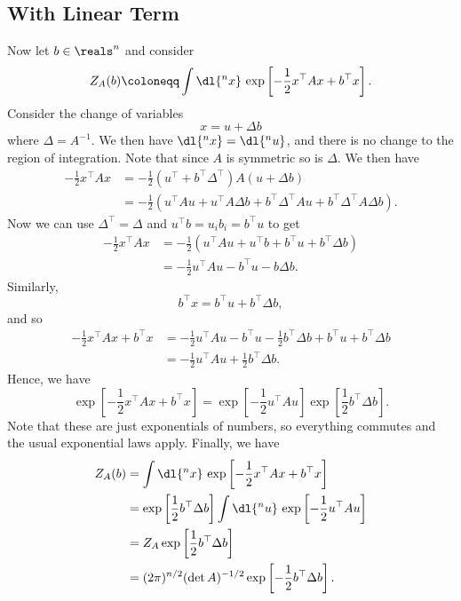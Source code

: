 \documentclass[fleqn]{NotesClass}
\newcommand{\trans}{{\top}}
\begin{document}
    \subsection{With Linear Term}
    Now let \(b \in \reals^n\) and consider
    \begin{equation}
        Z_A(b) \coloneqq \int \dl{^nx} \, \exp\left[ -\frac{1}{2} x^\trans Ax + b^\trans x \right].
    \end{equation}
    Consider the change of variables
    \begin{equation}
        x = u + \Delta b
    \end{equation}
    where \(\Delta = A^{-1}\).
    We then have \(\dl{^nx} = \dl{^nu}\), and there is no change to the region of integration.
    Note that since \(A\) is symmetric so is \(\Delta\).
    We then have
    \begin{align}
        -\frac{1}{2}x^\trans A x &= -\frac{1}{2}(u^\trans + b^\trans \Delta^\trans) A (u + \Delta b)\\
        &= -\frac{1}{2}(u^\trans A u + u^\trans A\Delta b + b^\trans \Delta^\trans A u + b^\trans \Delta^\trans A \Delta b).
    \end{align}
    Now we can use \(\Delta^\trans = \Delta\) and \(u^\trans b = u_ib_i = b^\trans u\) to get
    \begin{align}
        -\frac{1}{2} x^\trans A x &= -\frac{1}{2}(u^\trans A u + u^\trans b + b^\trans u + b^\trans \Delta b)\\
        &= -\frac{1}{2}u^\trans A u - b^\trans u - b \Delta b.
    \end{align}
    Similarly,
    \begin{equation}
        b^\trans x = b^\trans u + b^\trans \Delta b,
    \end{equation}
    and so
    \begin{align}
        -\frac{1}{2}x^\trans A x + b^\trans x &= -\frac{1}{2}u^\trans A u - b^\trans u - \frac{1}{2} b^\trans \Delta b + b^\trans u + b^\trans \Delta b\\
        &=  -\frac{1}{2} u^\trans A u + \frac{1}{2} b^\trans \Delta b.
    \end{align}
    Hence, we have
    \begin{equation}
        \exp\left[ -\frac{1}{2}x^\trans A x + b^\trans x \right] = \exp[-\frac{1}{2} u^\trans A u] \exp\left[ \frac{1}{2} b^\trans \Delta b \right].
    \end{equation}
    Note that these are just exponentials of numbers, so everything commutes and the usual exponential laws apply.
    Finally, we have
    \begin{align}
        Z_A(b) &= \int \dl{^nx} \, \exp\left[ -\frac{1}{2}x^\trans A x + b^\trans x \right]\\
        &= \exp\left[ \frac{1}{2}b^\trans \Delta b \right] \int \dl{^nu} \, \exp\left[ -\frac{1}{2}u^\trans A u \right]\\
        &= Z_A\exp\left[ \frac{1}{2}b^\trans \Delta b \right]\\
        &= (2\pi)^{n/2} (\det A)^{-1/2} \exp\left[ -\frac{1}{2}b^\trans \Delta b \right].
    \end{align}
    
\end{document}
